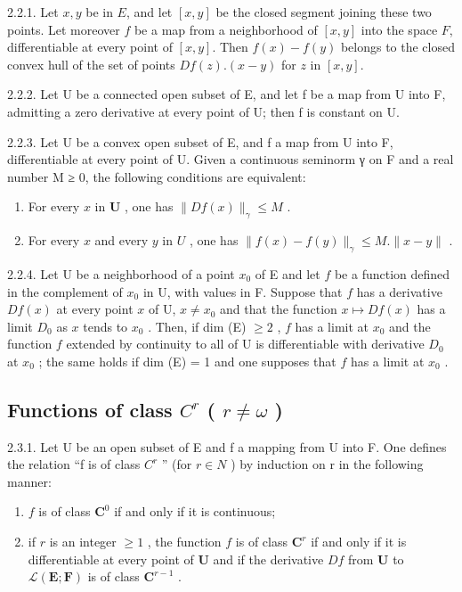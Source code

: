 2.2.1. Let \(x,y\) be in \(E\), and let \([x,y]\) be the closed segment joining these two points. Let moreover \(f\) be a map from a neighborhood of \([x,y]\) into the space \(F\), differentiable at every point of \([x,y]\). Then \(f(x)-f(y)\) belongs to the closed convex hull of the set of points \(Df(z).(x-y)\) for \(z\) in \([x,y]\).

2.2.2. Let U be a connected open subset of E, and let f be a map from U into
F, admitting a zero derivative at every point of U; then f is constant on U.

2.2.3. Let U be a convex open subset of E, and f a map from U into F, differentiable at every point of U. Given a continuous seminorm γ on F and a real number M ≥ 0, the following conditions are equivalent:

\begin{enumerate}
\def\labelenumi{(\roman{enumi})}
\item
  For every \(x\) in \(\mathbf{U}\) , one has \(\| Df(x)\|_{\gamma}\leqslant M\) .
\item
  For every \(x\) and every \(y\) in \(U\) , one has \(\| f(x) - f(y)\|_{\gamma} \leqslant M . \| x - y\| \) .
\end{enumerate}

2.2.4. Let U be a neighborhood of a point \(x_0\) of E and let \(f\) be a function defined in the complement of \(x_0\) in U, with values in F. Suppose that \(f\) has a derivative \(Df(x)\) at every point \(x\) of U, \(x \neq x_0\) and that the function \(x \mapsto Df(x)\) has a limit \(D_0\) as \(x\) tends to \(x_0\) . Then, if dim (E) \(\geqslant 2\) , \(f\) has a limit at \(x_0\) and the function \(f\) extended by continuity to all of U is differentiable with derivative \(D_0\) at \(x_0\) ; the same holds if dim (E) = 1 and one supposes that \(f\) has a limit at \(x_0\) .

\subsection{\texorpdfstring{Functions of class \(C^{r}\) ( \(r \neq \omega\) )}{Functions of class C\^{}\{r\} (r ≠ ω)}}

2.3.1. Let U be an open subset of E and f a mapping from U into F. One defines the relation “f is of class \(C^{r}\) ” (for \(r \in N\) ) by induction on r in the following manner:

\begin{enumerate}
\def\labelenumi{\arabic{enumi})}
\item
  \(f\) is of class \(\mathbf{C}^{0}\) if and only if it is continuous;
\item
  if \(r\) is an integer \(\geqslant 1\) , the function \(f\) is of class \(\mathbf{C}^{r}\) if and only if it is differentiable at every point of \(\mathbf{U}\) and if the derivative \(Df\) from \(\mathbf{U}\) to \(\mathcal{L}(\mathbf{E};\mathbf{F})\) is of class \(\mathbf{C}^{r-1}\) .
\end{enumerate}

